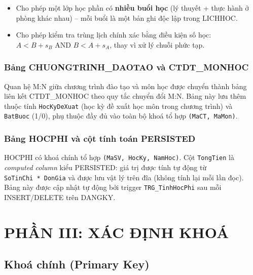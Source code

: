 \documentclass[13pt, a4paper]{article}
\begin{document}
\begin{itemize}[leftmargin=1.5cm]
  \item Cho phép một lớp học phần có \textbf{nhiều buổi học} (lý thuyết + thực hành ở phòng khác nhau) -- mỗi buổi là một bản ghi độc lập trong LICHHOC.
  \item Cho phép kiểm tra trùng lịch chính xác bằng điều kiện số học: $A < B + s_B \text{ AND } B < A + s_A$, thay vì xử lý chuỗi phức tạp.
\end{itemize}

\subsubsection{Bảng CHUONGTRINH\_DAOTAO và CTDT\_MONHOC}

\noindent Quan hệ M:N giữa chương trình đào tạo và môn học được chuyển thành bảng liên kết CTDT\_MONHOC theo quy tắc chuyển đổi M:N. Bảng này lưu thêm thuộc tính \texttt{HocKyDeXuat} (học kỳ đề xuất học môn trong chương trình) và \texttt{BatBuoc} (1/0), phụ thuộc đầy đủ vào toàn bộ khoá tổ hợp \texttt{(MaCT, MaMon)}.

\subsubsection{Bảng HOCPHI và cột tính toán PERSISTED}

\noindent HOCPHI có khoá chính tổ hợp \texttt{(MaSV, HocKy, NamHoc)}. Cột \texttt{TongTien} là \emph{computed column} kiểu PERSISTED: giá trị được tính tự động từ \texttt{SoTinChi~*~DonGia} và được lưu vật lý trên đĩa (không tính lại mỗi lần đọc). Bảng này được cập nhật tự động bởi trigger \texttt{TRG\_TinhHocPhi} sau mỗi INSERT/DELETE trên DANGKY.

\newpage
\section{PHẦN III: XÁC ĐỊNH KHOÁ}

\subsection{Khoá chính (Primary Key)}
\end{document}
